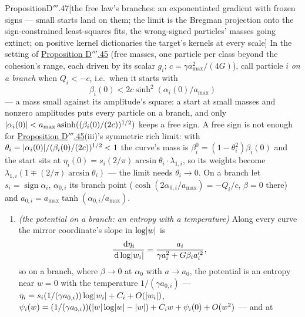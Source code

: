 \begin{thm}{Proposition}{D$'''$.47}[the free law's branches: an exponentiated gradient with frozen signs --- small starts
land on them; the limit is the Bregman projection onto the sign-constrained least-squares fits, the wrong-signed
particles' masses going extinct; on positive kernel dictionaries the target's kernels at every
scale]\label{res:thmDppp:47}%
In the setting of \hyperref[res:thmDppp:45]{Proposition D$'''$.45} (free masses, one particle per class beyond the
cohesion's range, each driven by its scalar $g_i$; $c = \gamma a_{\max}^2/(4G)$), call particle $i$ \emph{on a branch}
when $Q_i < -c$, i.e.\ when it starts with
\[
  \beta_i(0) < 2c\sinh^2(\alpha_i(0)/a_{\max})
\]
--- a mass small against its amplitude's square: a start at small masses and nonzero amplitudes puts every particle on
a branch, and only $\lvert \alpha_i(0)\rvert < a_{\max}\operatorname{asinh}((\beta_i(0)/(2c))^{1/2})$ keeps a free sign. A free
sign is not enough for \hyperref[res:thmDppp:45]{Proposition D$'''$.45}(iii)'s symmetric rich limit: with
$\theta_i = \lvert \alpha_i(0)\rvert/(\beta_i(0)/(2c))^{1/2} < 1$ the curve's mass is $\beta^0_i = (1 - \theta_i^2)\beta_i(0)$
and the start sits at $\eta_i(0) = s_i(2/\pi)\arcsin\theta_i\cdot\lambda_{1,i}$, so its weights become
$\lambda_{1,i}(1\mp(2/\pi)\arcsin\theta_i)$ --- the limit needs $\theta_i\to0$. On a branch let
$s_i = \operatorname{sign}\alpha_i$, $\alpha_{0,i}$ its branch point ($\cosh(2\alpha_{0,i}/a_{\max}) = -Q_i/c$,
$\beta = 0$ there) and $a_{0,i} = a_{\max}\tanh(\alpha_{0,i}/a_{\max})$.
\begin{enumerate}[label=\textup{(\roman*)}]
  \item \emph{(the potential on a branch: an entropy with a temperature)} Along every curve the mirror coordinate's
    slope in $\log\lvert w\rvert$ is
    \[
      \frac{\,\mathrm{d}\eta_i}{\,\mathrm{d}\log\lvert w_i\rvert} = \frac{a_i}{\gamma a_i^2 + G\beta_ia_i'^2},
    \]
    so on a branch, where $\beta\to0$ at $\alpha_0$ with $a\to a_0$, the potential is an entropy near $w = 0$ with the
    temperature $1/(\gamma a_{0,i})$ ---
    $\eta_i = s_i(1/(\gamma a_{0,i}))\log\lvert w_i\rvert + C_i + O(\lvert w_i\rvert)$,
    $\psi_i(w) = (1/(\gamma a_{0,i}))(\lvert w\rvert\log\lvert w\rvert - \lvert w\rvert) + C_iw + \psi_i(0) + O(w^2)$ --- and at

\end{enumerate}
\end{thm}
